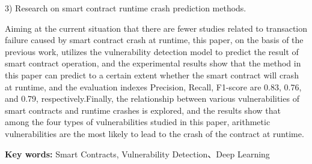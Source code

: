     3) Research on smart contract runtime crash prediction methods.
    
    Aiming at the current situation that there are fewer studies related to transaction failure caused by smart contract crash at runtime, this paper, on the basis of the previous work, utilizes the vulnerability detection model to predict the result of smart contract operation, and the experimental results show that the method in this paper can predict to a certain extent whether the smart contract will crash at runtime, and the evaluation indexes Precision, Recall, F1-score are 0.83, 0.76, and 0.79, respectively.Finally, the relationship between various vulnerabilities of smart contracts and runtime crashes is explored, and the results show that among the four types of vulnerabilities studied in this paper, arithmetic vulnerabilities are the most likely to lead to the crash of the contract at runtime.


    {\noindent \textbf{Key words: } Smart Contracts, Vulnerability Detection、Deep Learning}
